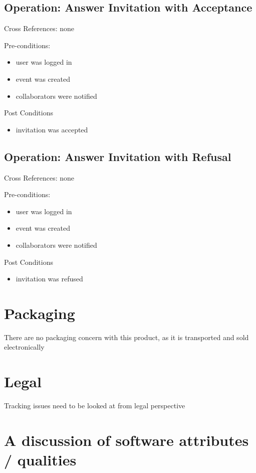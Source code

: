 \documentclass[10pt]{article}
\begin{document}
\subsection{Operation: Answer Invitation with Acceptance}

Cross References: none

Pre-conditions:
\begin{itemize}
\item user was logged in
\item event was created
\item collaborators were notified
\end{itemize}

Post Conditions
\begin{itemize}
\item invitation was accepted
\end{itemize}

\subsection{Operation: Answer Invitation with Refusal}

Cross References: none

Pre-conditions:
\begin{itemize}
\item user was logged in
\item event was created
\item collaborators were notified
\end{itemize}

Post Conditions
\begin{itemize}
\item invitation was refused
\end{itemize}

\section{Packaging}
There are no packaging concern with this product, as it is transported and sold electronically

\section{Legal}
Tracking issues need to be looked at from legal perspective

\section{A discussion of software attributes / qualities}
\end{document}
